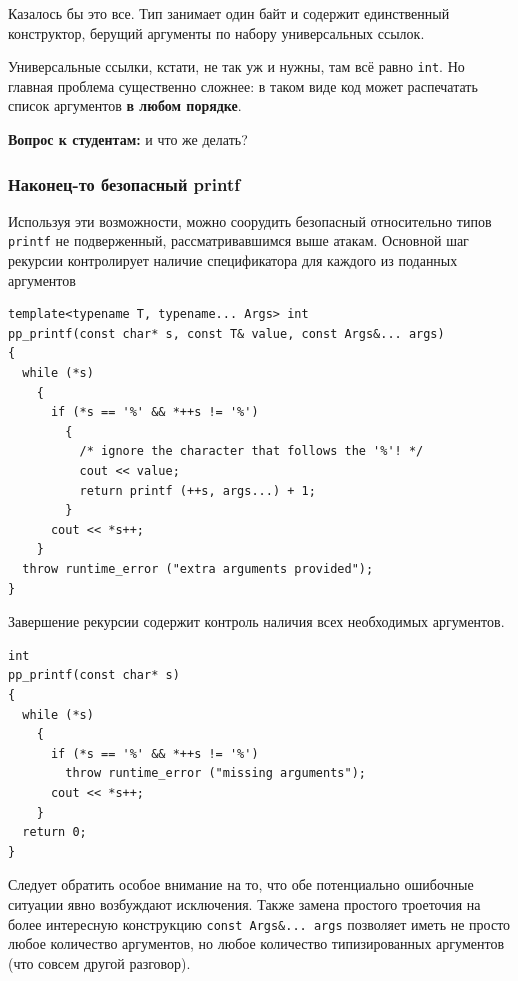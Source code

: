 \documentclass[a4paper,12pt,oneside]{article}
\newif\ifanswers
\begin{document}
Казалось бы это все. Тип занимает один байт и содержит единственный конструктор, берущий аргументы по набору универсальных ссылок.

Универсальные ссылки, кстати, не так уж и нужны, там всё равно \lstinline!int!. Но главная проблема существенно сложнее: в таком виде код может распечатать список аргументов \textbf{в любом порядке}.

\textbf{Вопрос к студентам:} и что же делать?

\ifanswers
Правильный ответ: вспомнить про синтаксис инициализации и сделать его правильно.

\begin{lstlisting}
struct expand_type
{
  expand_type(std::initializer_list<int>) {}
};
\end{lstlisting}
\fi

\subsubsection{Наконец-то безопасный printf}\label{TypesafePrintf}

Используя эти возможности, можно соорудить безопасный относительно типов \lstinline!printf! не подверженный, рассматривавшимся выше атакам. Основной шаг рекурсии контролирует наличие спецификатора для каждого из поданных аргументов

\begin{lstlisting}
template<typename T, typename... Args> int
pp_printf(const char* s, const T& value, const Args&... args)
{
  while (*s)
    {
      if (*s == '%' && *++s != '%')
        {
          /* ignore the character that follows the '%'! */
          cout << value;
          return printf (++s, args...) + 1;
        }
      cout << *s++;
    }
  throw runtime_error ("extra arguments provided");
}
\end{lstlisting}

Завершение рекурсии содержит контроль наличия всех необходимых аргументов.

\begin{lstlisting}
int
pp_printf(const char* s) 
{
  while (*s) 
    {
      if (*s == '%' && *++s != '%')
        throw runtime_error ("missing arguments");
      cout << *s++;
    }
  return 0;
}
\end{lstlisting}

Следует обратить особое внимание на то, что обе потенциально ошибочные ситуации явно возбуждают исключения. Также замена простого троеточия на более интересную конструкцию \lstinline!const Args&... args! позволяет иметь не просто любое количество аргументов, но любое количество типизированных аргументов (что совсем другой разговор).
\end{document}
